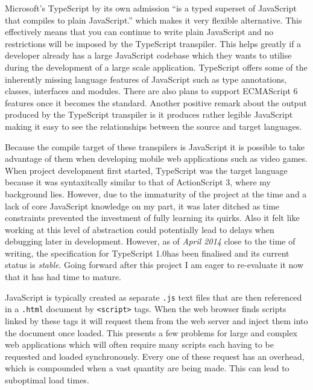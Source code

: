 \documentclass[final]{cmpreport}
\begin{document}
Microsoft's TypeScript by its own admission ``is a typed superset of JavaScript that compiles to plain JavaScript.'' which makes it very flexible alternative. This effectively means that you can continue to write plain JavaScript and no restrictions will be imposed by the TypeScript transpiler. This helps greatly if a developer already has a large JavaScript codebase which they wants to utilise during the development of a large scale application. TypeScript offers some of the inherently missing language features of JavaScript such as type annotations, classes, interfaces and modules. There are also plans to support ECMAScript 6 features once it becomes the standard. Another positive remark about the output produced by the TypeScript transpiler is it produces rather legible JavaScript making it easy to see the relationships between the source and target languages.

Because the compile target of these transpilers is JavaScript it is possible to take advantage of them when developing mobile web applications such as video games. When project development first started, TypeScript was the target language because it was syntaxitcally similar to that of ActionScript 3, where my background lies. However, due to the immaturity of the project at the time and a lack of core JavaScript knowledge on my part, it was later ditched as time constraints prevented the investment of fully learning its quirks. Also it felt like working at this level of abstraction could potentially lead to delays when debugging later in development. However, as of \textit{April 2014} close to the time of writing, the specification for TypeScript 1.0\footnotemark has been finalised and its current status is \textit{stable}. Going forward after this project I am eager to re-evaluate it now that it has had time to mature.


JavaScript is typically created as separate \texttt{.js} text files that are then referenced in a \texttt{.html} document by \texttt{<script>} tags. When the web browser finds scripts linked by these tags it will request them from the web server and inject them into the document once loaded. This presents a few problems for large and complex web applications which will often require many scripts each having to be requested and loaded synchronously. Every one of these request has an overhead, which is compounded when a vast quantity are being made. This can lead to suboptimal load times.
\end{document}
